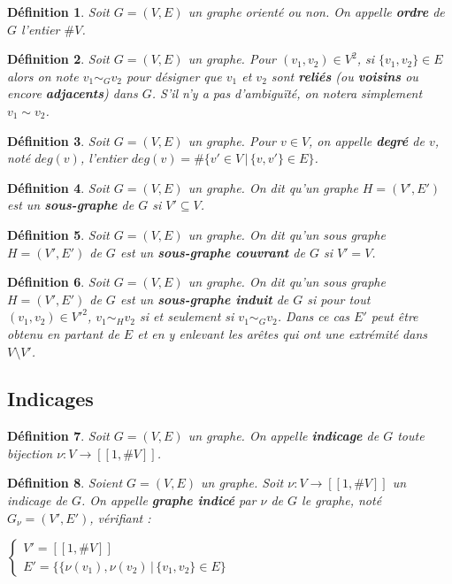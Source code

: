 \documentclass[french,a4paper]{article}
\newtheorem{definition}{Définition}[section]
\begin{document}
\begin{definition}
Soit $G=(V,E)$ un graphe orienté ou non.
On appelle \textbf{ordre} de $G$ l'entier $\#V$.
\end{definition}

\begin{definition}
Soit $G=(V,E)$ un graphe.
Pour $(v_1,v_2) \in V^2$, si $\{v_1,v_2\} \in E$ alors on note $v_1 \sim_G v_2$ pour désigner que $v_1$ et $v_2$ sont \textbf{reliés} (ou \textbf{voisins} ou encore \textbf{adjacents}) dans $G$. S'il n'y a pas d'ambiguïté, on notera simplement $v_1 \sim v_2$.
\end{definition}

\begin{definition}
Soit $G=(V,E)$ un graphe.
Pour $v \in V$, on appelle \textbf{degré} de $v$, noté $deg(v)$, l'entier $deg(v)=\#\{v' \in V \, | \, \{v,v'\} \in E\}$.
\end{definition}

\begin{definition}
Soit $G=(V,E)$ un graphe.
On dit qu'un graphe $H=(V',E')$ est un \textbf{sous-graphe} de $G$ si $V' \subseteq V$.
\end{definition}

\begin{definition}
Soit $G=(V,E)$ un graphe.
On dit qu'un sous graphe $H=(V',E')$ de $G$ est un \textbf{sous-graphe couvrant} de $G$ si $V' = V$.
\end{definition}


\begin{definition}
Soit $G=(V,E)$ un graphe.
On dit qu'un sous graphe $H=(V',E')$ de $G$ est un \textbf{sous-graphe induit} de $G$ si pour tout $(v_1,v_2) \in V'^2$, $v_1 \sim_H v_2$ si et seulement si $v_1 \sim_G v_2$. Dans ce cas $E'$ peut être obtenu en partant de $E$ et en y enlevant les arêtes qui ont une extrémité dans $V \setminus V'$.
\end{definition}

\subsection{Indicages}

\begin{definition}
Soit $G=(V,E)$ un graphe.
On appelle \textbf{indicage} de $G$ toute bijection $\nu : V \to [\![1,\#V]\!]$.
\end{definition}

\begin{definition}
Soient $G=(V,E)$ un graphe.
Soit $\nu : V \to [\![1,\#V]\!]$ un indicage de $G$. On appelle \textbf{graphe indicé} par $\nu$ de $G$ le graphe, noté $G_{\nu}=(V',E')$, vérifiant :

$\begin{cases} V'=[\![1,\#V]\!] \\ E'=\{\{\nu(v_1),\nu(v_2) \, | \, \{v_1,v_2\} \in E\} \end{cases}$
\end{definition}
\end{document}
